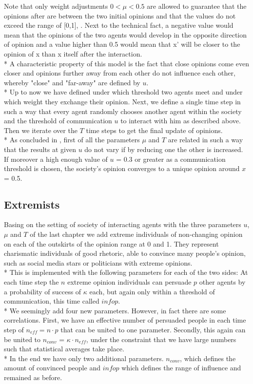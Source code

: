 \documentclass[11pt]{article}
\begin{document}
Note that only weight adjustments $0 < \mu < 0.5$ are allowed to guarantee that the opinions after are between the two initial opinions and that the values do not exceed the range of [0,1], . Next to the technical fact, a negative value would mean that the opinions of the two agents would develop in the opposite direction of opinion and a value higher than 0.5 would mean that x' will be closer to the opinion of x than x itself after the interaction. \\*
A characteristic property of this model is the fact that close opinions come even closer and opinions further away from each other do not influence each other, whereby "close" and "far-away" are defined by $u$. \\*
Up to now we have defined under which threshold two agents meet and under which weight they exchange their opinion. Next, we define a single time step in such a way that every agent randomly chooses another agent within the society and the threshold of communication $u$ to interact with him as described above. Then we iterate over the $T$ time steps to get the final update of opinions. \\*
As concluded in \cite{Minor}, first of all the parameters $\mu$ and $T$ are related in such a way that the results at given $u$ do not vary if by reducing one the other is increased. If moreover a high enough value of $u$ = 0.3 or greater as a communication threshold is chosen, the society's opinion converges to a unique opinion around $x$ = 0.5.

\subsection{Extremists}
Basing on the setting of society of interacting agents with the three parameters $u$, $\mu$ and $T$ of the last chapter we add extreme individuals of non-changing opinion on each of the outskirts of the opinion range at 0 and 1. They represent charismatic individuals of good rhetoric, able to convince many people's opinion, such as social media stars or politicians with extreme opinions. \\*
This is implemented with the following parameters for each of the two sides: At each time step the $n$ extreme opinion individuals can persuade $p$ other agents by a probability of success of $\kappa$ each, but again only within a threshold of communication, this time called $infop$. \\*
We seemingly add four new parameters. However, in fact there are some correlations.
First, we have an effective number of persuaded people in each time step of $n_{eff} = n \cdot p$ that can be united to one parameter. Secondly, this again can be united to $n_{conv}$ = $\kappa \cdot n_{eff}$, under the constraint that we have large numbers such that statistical averages take place. \\*
In the end we have only two additional parameters. $n_{conv}$, which defines the amount of convinced people and $infop$ which defines the range of influence and remained as before.
\end{document}
